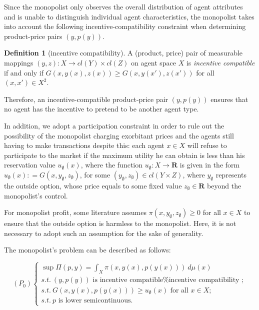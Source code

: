 \documentclass[a4paper, 11pt]{amsart}
\numberwithin{equation}{section}
\theoremstyle{plain}
\theoremstyle{definition}
\newtheorem{definition}[theorem]{Definition}
\theoremstyle{remark}
\newcommand{\R}{\mathbf{R}}
\begin{document}

{%
Since the monopolist only observes the overall distribution of agent attributes and is unable to distinguish individual agent characteristics, the monopolist takes into account the following incentive-compatibility constraint when determining product-price pairs $(y, p(y))$.
	}

\begin{definition}[incentive compatibility]
	A (product, price) pair of measurable mappings $(y,z): X \longrightarrow cl(Y) \times cl(Z)$ on agent space $X$ is \textit{incentive compatible} if and only if $G(x,y(x),z(x)) \ge G(x, y(x'), z(x'))$ for all $(x,x')\in X^2$.
\end{definition}

Therefore, an incentive-compatible product-price pair $(y, p(y))$ ensures that no agent has the incentive to pretend to be another agent type.\medskip 


In addition, we adopt a participation constraint in order to rule out the possibility of the monopolist charging exorbitant prices and the agents still having to make transactions despite this: each agent $x\in X$ will refuse to participate to the market if the maximum utility he can obtain %
is less than %
his reservation value $u_{\emptyset}(x)$, where the function $u_{\emptyset}: X \longrightarrow \R$ is given in the form $u_{\emptyset}(x): = G(x, y_{\emptyset}, z_{\emptyset})$, for some $(y_{\emptyset}, z_{\emptyset}) \in cl(Y \times Z)$, where $y_{\emptyset}$ represents the outside option, whose price equals to some fixed value $z_{\emptyset} \in \R$ beyond the monopolist's control. \medskip

{For monopolist profit, some literature assumes $\pi(x, y_{\emptyset}, z_{\emptyset}) \ge  0$ for all $x\in X$ to ensure that the outside option is harmless to the monopolist. Here, it is not necessary to adopt such an assumption for the sake of generality. \medskip} 

The monopolist's problem can be described as follows:


\begin{equation}\label{origin_problem}
(P_0)
\begin{cases}
\sup \Pi(p,y)=\int_{X} \pi(x, y(x), p(y(x)))~ d\mu(x)\\
s.t.\ (y,p(y)) \text{~is incentive compatible%
	};\\
s.t.\  G(x, y(x), p(y(x))) \ge u_{\emptyset}(x) \text{ for all } x \in X;\\
s.t.\ p \text{  is lower semicontinuous}.
\end{cases}
\end{equation}
\end{document}
